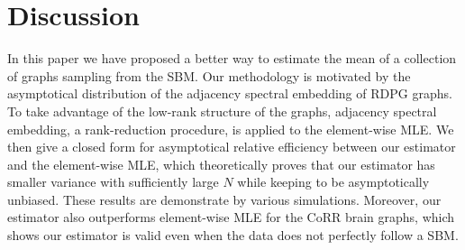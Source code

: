 \section{Discussion}

In this paper we have proposed a better way to estimate the mean of a collection of graphs sampling from the SBM. Our methodology is motivated by the asymptotical distribution of the adjacency spectral embedding of RDPG graphs.
To take advantage of the low-rank structure of the graphs, adjacency spectral embedding, a rank-reduction procedure, is applied to the element-wise MLE. We then give a closed form for asymptotical relative efficiency between our estimator and the element-wise MLE, which theoretically proves that our estimator has smaller variance with sufficiently large $N$ while keeping to be asymptotically unbiased. These results are demonstrate by various simulations. Moreover, our estimator also outperforms element-wise MLE for the CoRR brain graphs, which shows our estimator is valid even when the data does not perfectly follow a SBM.

